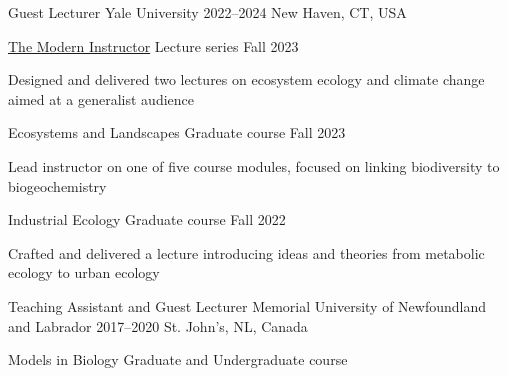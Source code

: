 

\begin{cventries}

  \cventry
    {Guest Lecturer} %
    {Yale University} %
    {2022--2024} %
    {New Haven, CT, USA} %
    {
      \begin{cvsubentries}
       \cvsubentry
        {\href{https://ypa.yale.edu/skills-and-career-development/modern-instructor}{The Modern Instructor}}
        {\footnotesize Lecture series}
        {Fall 2023}
        {
         \begin{cvitems}
          \item Designed and delivered two lectures on ecosystem ecology and climate change aimed at a generalist audience
         \end{cvitems} 
        }
       \cvsubentry
        {Ecosystems and Landscapes}
        {\footnotesize Graduate course}
        {Fall 2023}
        {
         \begin{cvitems}
          \item Lead instructor on one of five course modules, focused on linking biodiversity to biogeochemistry
         \end{cvitems} 
        }
       \cvsubentry
         {Industrial Ecology}
         {\footnotesize Graduate course}
         {Fall 2022}
         {
         \begin{cvitems}
          \item Crafted and delivered a lecture introducing ideas and theories from metabolic ecology to urban ecology
         \end{cvitems} 
         }
      \end{cvsubentries}
    }
  \cventry
    {Teaching Assistant and Guest Lecturer} %
    {Memorial University of Newfoundland and Labrador} %
    {2017--2020} %
    {St. John's, NL, Canada} %
    {
      \begin{cvsubentries}
       \cvsubentry
         {Models in Biology}
         {\footnotesize Graduate and Undergraduate course}

\end{cvsubentries}}
\end{cventries}
